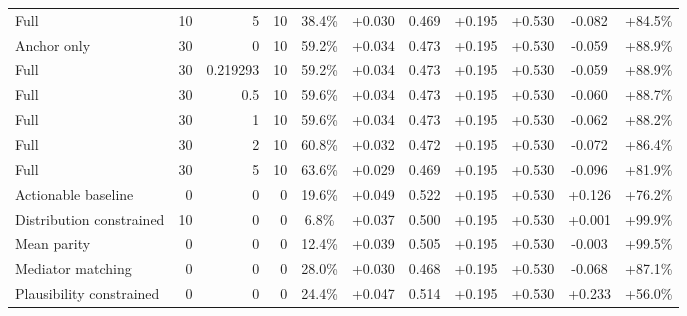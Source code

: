 \begin{table}[htbp]
\begin{tabular}{lrrrccccccc}
Full & 10 & 5 & 10 & 38.4\% & +0.030 & 0.469 & +0.195 & +0.530 & -0.082 & +84.5\% \\
Anchor only & 30 & 0 & 10 & 59.2\% & +0.034 & 0.473 & +0.195 & +0.530 & -0.059 & +88.9\% \\
Full & 30 & 0.219293 & 10 & 59.2\% & +0.034 & 0.473 & +0.195 & +0.530 & -0.059 & +88.9\% \\
Full & 30 & 0.5 & 10 & 59.6\% & +0.034 & 0.473 & +0.195 & +0.530 & -0.060 & +88.7\% \\
Full & 30 & 1 & 10 & 59.6\% & +0.034 & 0.473 & +0.195 & +0.530 & -0.062 & +88.2\% \\
Full & 30 & 2 & 10 & 60.8\% & +0.032 & 0.472 & +0.195 & +0.530 & -0.072 & +86.4\% \\
Full & 30 & 5 & 10 & 63.6\% & +0.029 & 0.469 & +0.195 & +0.530 & -0.096 & +81.9\% \\
Actionable baseline & 0 & 0 & 0 & 19.6\% & +0.049 & 0.522 & +0.195 & +0.530 & +0.126 & +76.2\% \\
Distribution constrained & 10 & 0 & 0 & 6.8\% & +0.037 & 0.500 & +0.195 & +0.530 & +0.001 & +99.9\% \\
Mean parity & 0 & 0 & 0 & 12.4\% & +0.039 & 0.505 & +0.195 & +0.530 & -0.003 & +99.5\% \\
Mediator matching & 0 & 0 & 0 & 28.0\% & +0.030 & 0.468 & +0.195 & +0.530 & -0.068 & +87.1\% \\
Plausibility constrained & 0 & 0 & 0 & 24.4\% & +0.047 & 0.514 & +0.195 & +0.530 & +0.233 & +56.0\% \\
\bottomrule
\end{tabular}
\end{table}